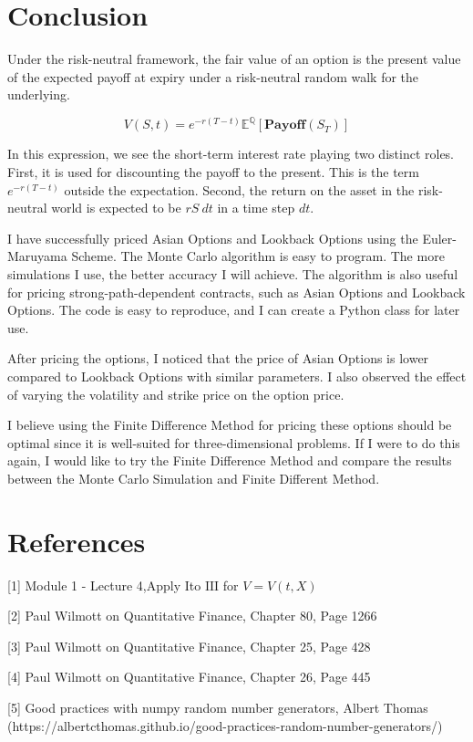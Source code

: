 \documentclass[11pt]{article}
\begin{document}
    \section{Conclusion}\label{conclusion}

    Under the risk-neutral framework, the fair value of an option is the
present value of the expected payoff at expiry under a risk-neutral
random walk for the underlying.

\[
V(S,t) = e^{-r(T-t)}\mathbb{E}^\mathbb{Q}[\mathbf{Payoff}(S_{T})]
\]

In this expression, we see the short-term interest rate playing two
distinct roles. First, it is used for discounting the payoff to the
present. This is the term \(e^{-r(T - t)}\) outside the expectation.
Second, the return on the asset in the risk-neutral world is expected to
be \(rS \: dt\) in a time step \(dt\).

I have successfully priced Asian Options and Lookback Options using the
Euler-Maruyama Scheme. The Monte Carlo algorithm is easy to program. The
more simulations I use, the better accuracy I will achieve. The
algorithm is also useful for pricing strong-path-dependent contracts,
such as Asian Options and Lookback Options. The code is easy to
reproduce, and I can create a Python class for later use.

After pricing the options, I noticed that the price of Asian Options is
lower compared to Lookback Options with similar parameters. I also
observed the effect of varying the volatility and strike price on the
option price.

I believe using the Finite Difference Method for pricing these options
should be optimal since it is well-suited for three-dimensional
problems. If I were to do this again, I would like to try the Finite
Difference Method and compare the results between the Monte Carlo
Simulation and Finite Different Method.

    \section{References}\label{references}

    {[}1{]} Module 1 - Lecture 4,Apply Ito \(\text{III}\) for \(V = V(t,X)\)

{[}2{]} Paul Wilmott on Quantitative Finance, Chapter 80, Page 1266

{[}3{]} Paul Wilmott on Quantitative Finance, Chapter 25, Page 428

{[}4{]} Paul Wilmott on Quantitative Finance, Chapter 26, Page 445

{[}5{]} Good practices with numpy random number generators, Albert
Thomas
(https://albertcthomas.github.io/good-practices-random-number-generators/)


    
    
    
\end{document}
